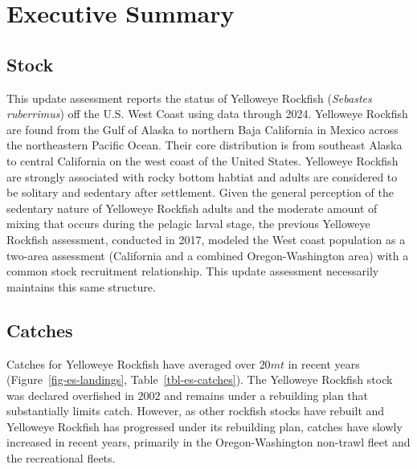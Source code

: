 \documentclass[
]{scrartcl}
\begin{document}
\newpage{}

\newpage{}


\section*{Executive Summary}\label{executive-summary}

\subsection*{Stock}\label{stock}

This update assessment reports the status of Yelloweye Rockfish
(\emph{Sebastes ruberrimus}) off the U.S. West Coast using data through
2024. Yelloweye Rockfish are found from the Gulf of Alaska to northern
Baja California in Mexico across the northeastern Pacific Ocean. Their
core distribution is from southeast Alaska to central California on the
west coast of the United States. Yelloweye Rockfish are strongly
associated with rocky bottom habtiat and adults are considered to be
solitary and sedentary after settlement. Given the general perception of
the sedentary nature of Yelloweye Rockfish adults and the moderate
amount of mixing that occurs during the pelagic larval stage, the
previous Yelloweye Rockfish assessment, conducted in 2017, modeled the
West coast population as a two-area assessment (California and a
combined Oregon-Washington area) with a common stock recruitment
relationship. This update assessment necessarily maintains this same
structure.

\subsection*{Catches}\label{catches}

Catches for Yelloweye Rockfish have averaged over \(20 mt\) in recent
years (Figure~\ref{fig-es-landings}, Table~\ref{tbl-es-catches}). The
Yelloweye Rockfish stock was declared overfished in \(2002\) and remains
under a rebuilding plan that substantially limits catch. However, as
other rockfish stocks have rebuilt and Yelloweye Rockfish has progressed
under its rebuilding plan, catches have slowly increased in recent
years, primarily in the Oregon-Washington non-trawl fleet and the
recreational fleets.
\end{document}
